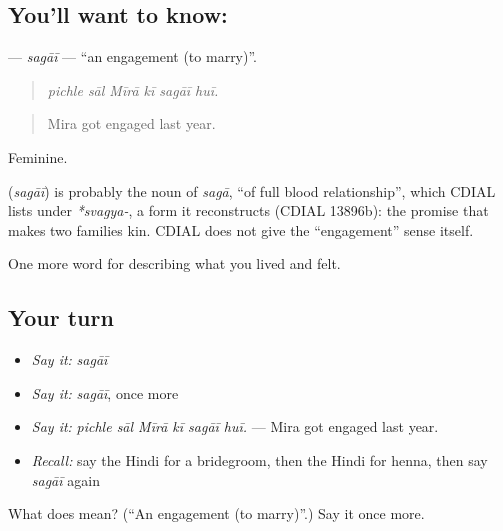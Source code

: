 \subsection*{You'll want to know: }
\textbf{} — \emph{sagāī} — \textquotedblleft{}an engagement (to marry)\textquotedblright{}.

\begin{quote}
     
\end{quote}

\begin{quote}
\emph{pichle sāl Mīrā kī sagāī huī.}
\end{quote}

\begin{quote}
Mira got engaged last year.
\end{quote}

Feminine.

\begin{cousinweb}
\textbf{} (\emph{sagāī}) is probably the noun of \emph{sagā}, \textquotedblleft{}of full blood relationship\textquotedblright{}, which CDIAL lists under \emph{*svagya-}, a form it reconstructs (CDIAL 13896b): the promise that makes two families kin. CDIAL does not give the \textquotedblleft{}engagement\textquotedblright{} sense itself.
\end{cousinweb}

\begin{grammarlens}[title={What you've built}]
One more word for describing what you lived and felt.
\end{grammarlens}

\subsection*{Your turn}
\begin{itemize}
\raggedright
  \item \emph{Say it:} \emph{sagāī}
  \item \emph{Say it:} \emph{sagāī}, once more
  \item \emph{Say it:} \emph{pichle sāl Mīrā kī sagāī huī.} — Mira got engaged last year.
  \item \emph{Recall:} say the Hindi for a bridegroom, then the Hindi for henna, then say \emph{sagāī} again
\end{itemize}

\begin{tcolorbox}[breakable,colback=teal!4,colframe=teal!35!black,title={Before you move on}]
What does  mean? (\textquotedblleft{}An engagement (to marry)\textquotedblright{}.) Say it once more.
\end{tcolorbox}

